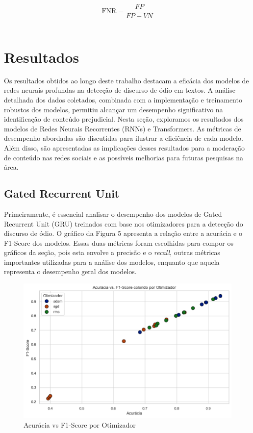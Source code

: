 \documentclass[conference]{IEEEtran}
\begin{document}
\begin{enumerate}
    \begin{equation}
    \text{FNR} = \frac{FP}{FP + VN}
    \end{equation} \\
    
\end{enumerate}

\section{Resultados}

Os resultados obtidos ao longo deste trabalho destacam a eficácia dos modelos de redes neurais profundas na detecção de discurso de ódio em textos. A análise detalhada dos dados coletados, combinada com a implementação e treinamento robustos dos modelos, permitiu alcançar um desempenho significativo na identificação de conteúdo prejudicial. Nesta seção, exploramos os resultados dos modelos de Redes Neurais Recorrentes (RNNs) e Transformers. As métricas de desempenho abordadas são discutidas para ilustrar a eficiência de cada modelo. Além disso, são apresentadas as implicações desses resultados para a moderação de conteúdo nas redes sociais e as possíveis melhorias para futuras pesquisas na área.

\subsection{Gated Recurrent Unit}

Primeiramente, é essencial analisar o desempenho dos modelos de Gated Recurrent Unit (GRU) treinados com base nos otimizadores para a detecção do discurso de ódio. O gráfico da Figura 5 apresenta a relação entre a acurácia e o F1-Score dos modelos. Essas duas métricas foram escolhidas para compor os gráficos da seção, pois esta envolve a precisão e o \textit{recall}, outras métricas importantes utilizadas para a análise dos modelos, enquanto que aquela representa o desempenho geral dos modelos.

\begin{figure}[h!]
    \centering
    \includegraphics[width=\linewidth]{images/gru-otimizador.png}
    \caption{Acurácia vs F1-Score por Otimizador}
    \label{fig:exemplo4}
\end{figure}
\end{document}
